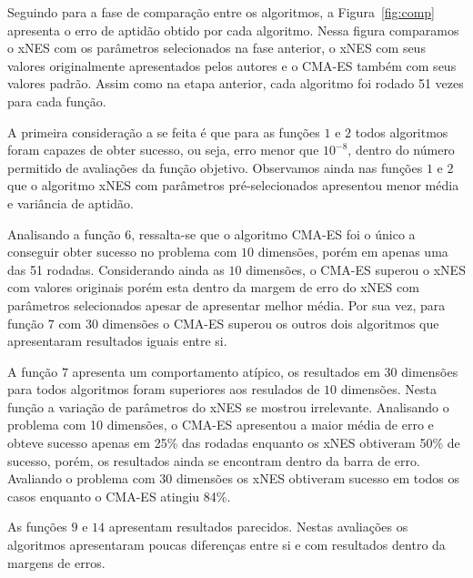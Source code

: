 Seguindo para a fase de comparação entre os algoritmos, a Figura~\ref{fig:comp} apresenta o erro de aptidão obtido por
cada algoritmo.
Nessa figura comparamos o xNES com os parâmetros selecionados na fase anterior, o xNES com seus valores originalmente
apresentados pelos autores e o CMA-ES também com seus valores padrão.
Assim como na etapa anterior, cada algoritmo foi rodado 51 vezes para cada função.

A primeira consideração a se feita é que para as funções $1$ e $2$ todos algoritmos foram capazes de obter sucesso, ou seja,
erro menor que $10^{-8}$, dentro do número permitido de avaliações da função objetivo.
Observamos ainda nas funções $1$ e $2$ que o algoritmo xNES com parâmetros pré-selecionados apresentou menor média e
variância de aptidão.

Analisando a função $6$, ressalta-se que o algoritmo CMA-ES foi o único a conseguir obter sucesso no problema com $10$
dimensões, porém em apenas uma das 51 rodadas.
Considerando ainda as $10$ dimensões, o CMA-ES superou o xNES com valores originais porém esta dentro da margem de
erro do xNES com parâmetros selecionados apesar de apresentar melhor média.
Por sua vez, para função $7$ com $30$ dimensões o CMA-ES superou os outros dois algoritmos que apresentaram resultados
iguais entre si.

A função $7$ apresenta um comportamento atípico, os resultados em $30$ dimensões para todos algoritmos foram superiores
aos resulados de $10$ dimensões.
Nesta função a variação de parâmetros do xNES se mostrou irrelevante.
Analisando o problema com 10 dimensões, o CMA-ES apresentou a maior média de erro e obteve sucesso apenas em 25\% das
rodadas enquanto os xNES obtiveram 50\% de sucesso, porém, os resultados ainda se encontram dentro da barra de erro.
Avaliando o problema com $30$ dimensões os xNES obtiveram sucesso em todos os casos enquanto o CMA-ES atingiu 84\%.

As funções $9$ e $14$ apresentam resultados parecidos.
Nestas avaliações os algoritmos apresentaram poucas diferenças entre si e com resultados dentro da margens de erros.

